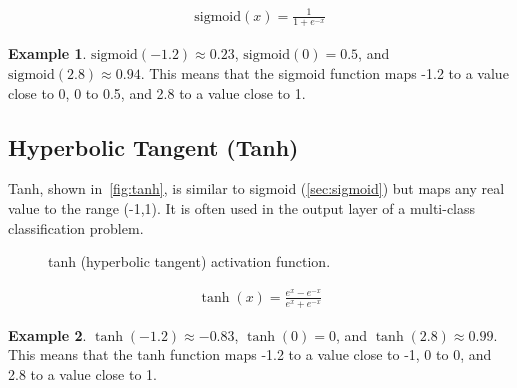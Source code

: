 \documentclass[oneside,11pt,dvipsnames]{book}
\numberwithin{equation}{section}
\theoremstyle{definition}
\newtheorem{example}{Example}[section]
\theoremstyle{remark}
\newcommand{\sigmoid}[1]{\mathrm{sigmoid}\left(#1\right)}
\begin{document}
    \begin{align}
        \sigmoid{x} = \frac{1}{1+e^{-x}}
    \end{align}

\begin{example}
$\sigmoid{-1.2} \approx 0.23$, $\sigmoid{0} = 0.5$, and $\sigmoid{2.8} \approx 0.94$. This means that the sigmoid function maps -1.2 to a value close to 0, 0 to 0.5, and 2.8 to a value close to 1.
\end{example}

\subsection{Hyperbolic Tangent (Tanh)}\label{sec:tanh}

Tanh, shown in~\autoref{fig:tanh}, is similar to sigmoid (\autoref{sec:sigmoid})  but maps any real value to the range (-1,1). It is often used in the output layer of a multi-class classification problem.

\begin{figure}[htp]
    \centering
    \caption{tanh (hyperbolic tangent) activation function.}\label{fig:tanh}
\end{figure}

\begin{align}
\tanh(x) = \frac{e^x-e^{-x}}{e^x+e^{-x}}
\end{align}

\begin{example}
$\tanh(-1.2) \approx -0.83$, $\tanh(0) = 0$, and $\tanh(2.8) \approx 0.99$. This means that the tanh function maps -1.2 to a value close to -1, 0 to 0, and 2.8 to a value close to 1.
\end{example}
\end{document}
